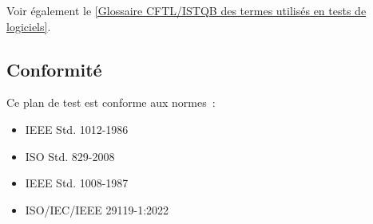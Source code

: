 Voir également le \href{https://www.cftl.fr/wp-content/uploads/2018/10/Glossaire-des-tests-logiciels-v3_2F-ISTQB-CFTL-1.pdf}{[Glossaire CFTL/ISTQB des termes utilisés en tests de logiciels]}.\\

\subsection{Conformité}
\label{sec:intro:conf}

Ce plan de test est conforme aux normes~:

\begin{itemize}
    \item IEEE Std. 1012-1986
    \item ISO Std. 829-2008
    \item IEEE Std. 1008-1987
    \item ISO/IEC/IEEE 29119-1:2022
\end{itemize}